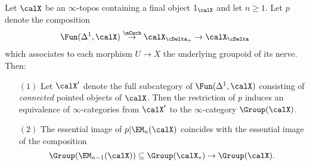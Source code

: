 \begin{lemma}\label{preEM}
Let $\calX$ be an $\infty$-topos containing a final object $1_{\calX}$ and let $n \geq 1$.
Let $p$ denote the composition
$$ \Fun(\Delta^1,\calX) \stackrel{\mCech}{\rightarrow} \calX_{\cDelta_{+}} \rightarrow \calX_{\cDelta}$$
which associates to each morphism $U \rightarrow X$ the underlying groupoid of its \Cech nerve.
Then:
\begin{itemize}
\item[$(1)$] Let $\calX'$ denote the full subcategory of $\Fun(\Delta^1,\calX)$ consisting
of {\em connected} pointed objects of $\calX$. Then the restriction of $p$ induces an equivalence of $\infty$-categories from $\calX'$ to the $\infty$-category $\Group(\calX)$.

\item[$(2)$] The essential image of $p| \EM_{n}(\calX)$ coincides with
the essential image of the composition
$$ \Group( \EM_{n-1}(\calX)) \subseteq \Group( \calX_{\ast}) \rightarrow \Group(\calX).$$
\end{itemize}
\end{lemma}

